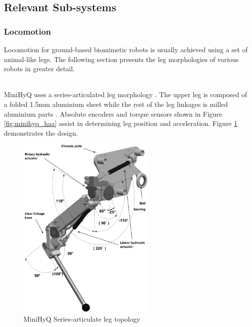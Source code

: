 \subsection{Relevant Sub-systems}


\subsubsection{Locomotion}

Locomotion for ground-based biomimetic robots is usually achieved using a set of animal-like legs.
The following section presents the leg morphologies of various robots in greater detail.

 \mbox{}\\

MiniHyQ uses a series-articulated leg morphology \cite{khan_minihyq_2015}.
The upper leg is composed of a folded 1.5mm aluminium sheet while the rest of the leg linkages is milled aluminium parts \cite{khan_development_2015}.
Absolute encoders and torque sensors shown in Figure \ref{fig:minihyq_haa} assist in determining leg position and acceleration.
Figure \ref{fig:minihyq_topology} demonstrates the design.

\begin{figure}[H]
    \centering
    \includegraphics[width=0.6\textwidth]{Sections/LiteratureReview/img/minihyq/subsys_minihyq_topology.png}
    \caption{MiniHyQ Series-articulate leg topology \cite{khan_minihyq_2015}}
    \label{fig:minihyq_topology}
\end{figure}

